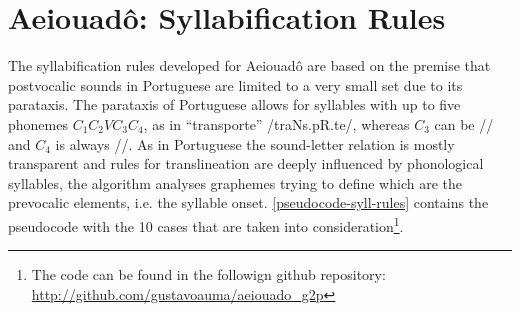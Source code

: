\chapter{Aeiouad\^o: Syllabification Rules} 

The syllabification rules developed for Aeiouad\^o are based on the premise that postvocalic sounds in Portuguese are limited to a very small set due to its parataxis. The parataxis of Portuguese allows for syllables with up to five phonemes $C_1C_2VC_3C_4$, as in ``transporte'' /traNs.pR.te/, whereas $C_3$ can be // and $C_4$ is always //. As in Portuguese the sound-letter relation is mostly transparent and rules for translineation are deeply influenced by phonological syllables, the algorithm analyses graphemes trying to define which are the prevocalic elements, i.e. the syllable onset. \autoref{pseudocode-syll-rules} contains the pseudocode with the 10 cases that are taken into consideration\footnote{The code can be found in the followign github repository: \url{http://github.com/gustavoauma/aeiouado_g2p}}.


